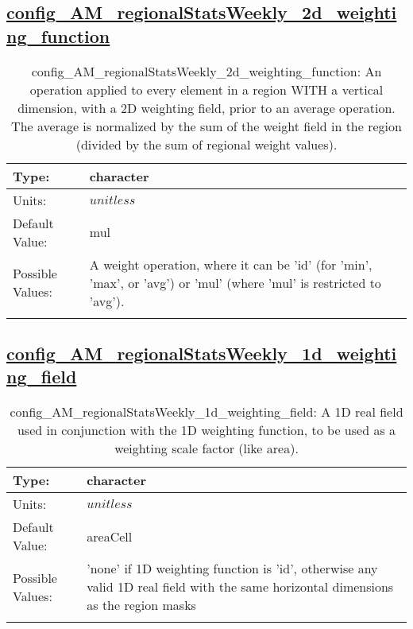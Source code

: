 \subsection[config\_AM\_regionalStatsWeekly\_2d\_weighting\_function]{\hyperref[sec:nm_tab_AM_regionalStatsWeekly]{config\_AM\_regionalStatsWeekly\_2d\_weighting\_function}}
\label{subsec:nm_sec_config_AM_regionalStatsWeekly_2d_weighting_function}
\begin{center}
\begin{longtable}{| p{2.0in} || p{4.0in} |}
    \hline
    Type: & character \\
    \hline
    Units: & $unitless$ \\
    \hline
    Default Value: & mul \\
    \hline
    Possible Values: & A weight operation, where it can be 'id' (for 'min', 'max', or 'avg') or 'mul' (where 'mul' is restricted to 'avg'). \\
    \hline
    \caption{config\_AM\_regionalStatsWeekly\_2d\_weighting\_function: An operation applied to every element in a region WITH a vertical dimension, with a 2D weighting field, prior to an average operation. The average is normalized by the sum of the weight field in the region (divided by the sum of regional weight values).}
\end{longtable}
\end{center}
\subsection[config\_AM\_regionalStatsWeekly\_1d\_weighting\_field]{\hyperref[sec:nm_tab_AM_regionalStatsWeekly]{config\_AM\_regionalStatsWeekly\_1d\_weighting\_field}}
\label{subsec:nm_sec_config_AM_regionalStatsWeekly_1d_weighting_field}
\begin{center}
\begin{longtable}{| p{2.0in} || p{4.0in} |}
    \hline
    Type: & character \\
    \hline
    Units: & $unitless$ \\
    \hline
    Default Value: & areaCell \\
    \hline
    Possible Values: & 'none' if 1D weighting function is 'id', otherwise any valid 1D real field with the same horizontal dimensions as the region masks \\
    \hline
    \caption{config\_AM\_regionalStatsWeekly\_1d\_weighting\_field: A 1D real field used in conjunction with the 1D weighting function, to be used as a weighting scale factor (like area).}
\end{longtable}
\end{center}
